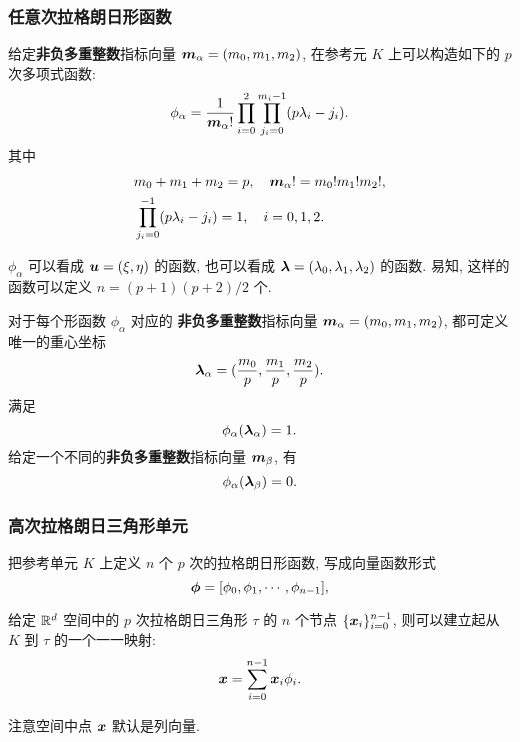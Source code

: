 \documentclass{beamer}
\numberwithin{subsection}{section}
\begin{document}
\begin{frame}
    \frametitle{任意次拉格朗日形函数}

    给定{\bf 非负多重整数}指标向量 ${\boldsymbol m}_\alpha = (m_0, m_1, m_2)$, 在参考元 $K$ 上可以构造如下的 $p$ 次多项式函数:
    \begin{equation}
        \phi_{\alpha} = \frac{1}{{\boldsymbol m}_\alpha!}\prod_{i=0}^{2}\prod_{j_i =
        0}^{m_i - 1} (p\lambda_i - j_i).
        \label{eq:phi0}
    \end{equation}
    其中
    \begin{align*}
        &m_0 + m_1 + m_2 = p,\quad {\boldsymbol m}_\alpha! = m_0!m_1!m_2!, \\
        &\prod_{j_i=0}^{-1}(p\lambda_i - j_i) = 1,\quad i = 0, 1, 2.
    \end{align*}
    \begin{remark}
        $\phi_{\alpha}$ 可以看成 ${\boldsymbol u}=(\xi, \eta)$ 的函数, 也可以看成 ${\bm \lambda}
        = (\lambda_0, \lambda_1, \lambda_2)$ 的函数. 易知, 这样的函数可以定义
        $n=(p+1)(p+2)/2$ 个.
    \end{remark}
\end{frame}

\begin{frame}
    对于每个形函数 $\phi_\alpha$ 对应的 {\bf 非负多重整数}指标向量 ${\boldsymbol m}_\alpha = (m_0, m_1,
    m_2)$, 都可定义唯一的重心坐标
    $$
        {\bm \lambda}_\alpha = (\frac{m_0}{p}, \frac{m_1}{p},\frac{m_2}{p}).
    $$
    满足
    \begin{equation*}
        \phi_\alpha({\bm \lambda}_\alpha) = 1.
    \end{equation*}
    给定一个不同的{\bf 非负多重整数}指标向量 ${\boldsymbol m}_\beta$, 有
    \begin{equation*}
        \phi_\alpha({\bm \lambda}_\beta) = 0.
    \end{equation*}
\end{frame} 

\begin{frame}
    \frametitle{高次拉格朗日三角形单元}
    把参考单元 $K$ 上定义 $n$ 个 $p$ 次的拉格朗日形函数, 写成向量函数形式
    $$
        {\bm \phi} = [\phi_0, \phi_1, \cdots, \phi_{n-1}],
    $$

    给定 ${\mathbb R}^d$ 空间中的 $p$ 次拉格朗日三角形 $\tau$ 的 $n$ 个节点
    $\{{\boldsymbol x}_i\}_{i=0}^{n-1}$, 则可以建立起从 $K$ 到 $\tau$ 的一个一一映射:
    \begin{equation*}
        {\boldsymbol x} = \sum_{i=0}^{n-1}{\boldsymbol x}_i\phi_i.
    \end{equation*}
    \begin{remark}
        注意空间中点 ${\boldsymbol x}$ 默认是列向量.
    \end{remark}
\end{frame}
\end{document}
